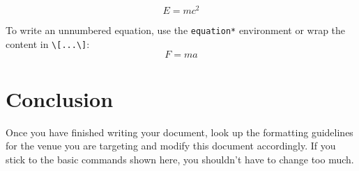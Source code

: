 \documentclass[letterpaper]{article}
\begin{document}
\begin{equation}
E = mc^2
\end{equation}

To write an unnumbered equation, use the \texttt{equation*} environment or wrap the content in \verb=\[...\]=:
\[
F = ma
\]

\section{Conclusion}
Once you have finished writing your document, look up the formatting guidelines for the venue you are targeting and modify this document accordingly.
If you stick to the basic commands shown here, you shouldn't have to change too much.

\printbibliography
\end{document}
